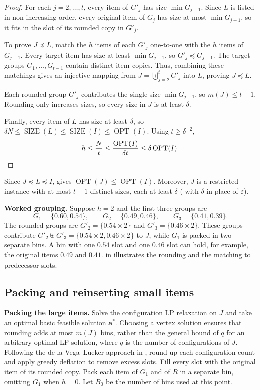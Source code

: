 \documentclass[11pt,a4paper,onecolumn]{article}
\theoremstyle{plain}
\theoremstyle{definition}
\theoremstyle{remark}
\DeclareMathOperator{\OPT}{OPT}
\DeclareMathOperator{\SIZE}{SIZE}
\begin{document}
\begin{proof}
For each $j=2,\ldots,t$, every item of $G'_j$ has size
$\min G_{j-1}$. Since $L$ is listed in non-increasing order,
every original item of $G_j$ has size at most $\min G_{j-1}$,
so it fits in the slot of its rounded copy in $G'_j$.

To prove $J\preceq L$, match the $h$ items of each $G'_j$
one-to-one with the $h$ items of $G_{j-1}$. Every target item
has size at least $\min G_{j-1}$, so $G'_j\preceq G_{j-1}$.
The target groups $G_1,\ldots,G_{t-1}$ contain distinct item copies.
Thus, combining these matchings gives an injective mapping from
$J=\biguplus_{j=2}^{t}G'_j$ into $L$, proving $J\preceq L$.

Each rounded group $G'_j$ contributes the single size $\min G_{j-1}$, so
$m(J)\le t-1$. Rounding only increases sizes, so every size in $J$ is
at least $\delta$.

Finally, every item of $L$ has size at least $\delta$, so
$\delta N\le\SIZE(L)\le\SIZE(I)\le\OPT(I)$. Using $t\ge\delta^{-2}$,
\[
  h\le\frac{N}{t}\le\frac{\OPT(I)}{\delta t}\le\delta\OPT(I).\qedhere
\]
\end{proof}

Since $J\preceq L\preceq I$,  gives
$\OPT(J)\le\OPT(I)$. Moreover, $J$ is a restricted instance with at
most $t-1$ distinct sizes, each at least $\delta$
( with $\delta$ in place of $\varepsilon$).

\smallskip
\noindent\textbf{Worked grouping.}
Suppose $h=2$ and the first three groups are
\[
  G_1=\{0.60,0.54\},\qquad G_2=\{0.49,0.46\},\qquad
  G_3=\{0.41,0.39\}.
\]
The rounded groups are $G'_2=\{0.54\times2\}$ and
$G'_3=\{0.46\times2\}$. These groups contribute
$G'_2\uplus G'_3=\{0.54\times2,0.46\times2\}$ to $J$, while $G_1$ is packed in
two separate bins. A bin with one $0.54$ slot and one $0.46$ slot can
hold, for example, the original items $0.49$ and $0.41$.
 in 
illustrates the rounding and the matching to predecessor slots.

\subsection{Packing and reinserting small items}
\label{subsec:dlvl-packing}

\smallskip
\noindent\textbf{Packing the large items.}
Solve the configuration LP relaxation on $J$ and take an optimal
basic feasible solution $\mathbf{a}^*$. Choosing a vertex solution
ensures that rounding adds at most $m(J)$ bins, rather than the
general bound of $q$ for an arbitrary optimal LP solution, where
$q$ is the number of configurations of $J$.
Following the de la Vega--Lueker
approach in , round up each configuration count
and apply greedy deflation to remove excess slots. Fill every slot
with the original item of its rounded copy. Pack each item of $G_1$
and of $R$ in a separate bin, omitting $G_1$ when $h=0$. Let $B_0$ be
the number of bins used at this point.
\end{document}
